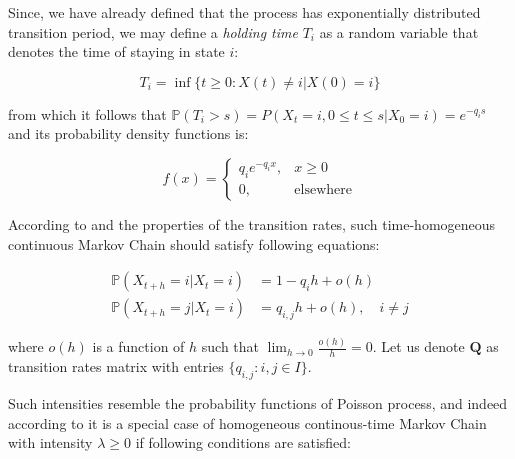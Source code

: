 Since, we have already defined that the process has exponentially distributed transition period, we may define a \textit{holding time} $T_i$ as a random variable that denotes the time of staying in state $i$:

\begin{equation}
T_i = \inf \{t \geq 0 : X(t) \neq i | X(0) = i\}
\end{equation}

from which it follows that $\mathbb{P}(T_i>s) = P(X_t=i,0 \leq t \leq s|X_0=i) = e^{-q_i s}$ and its probability density functions is:

\begin{equation}
    f(x) = 
    \begin{cases}
        q_i e^{-q_i x}, & x \geq 0\\
        0, & \text{elsewhere}
    \end{cases}
\end{equation}

According to \citep{Praskova2012} and the properties of the transition rates, such time-homogeneous continuous Markov Chain should satisfy following equations:

\begin{equation}
    \begin{aligned}
        \mathbb{P}(X_{t+h}=i|X_t=i) &= 1 - q_i h + o(h) \\
        \mathbb{P}(X_{t+h}=j|X_t=i) &= q_{i,j} h + o(h), \quad i \neq j
    \end{aligned}
\end{equation}

where $o(h)$ is a function of $h$ such that $\lim_{h \to 0} \frac{o(h)}{h} = 0$. Let us denote $\textbf{Q}$ as transition rates matrix with entries $\{q_{i,j}: i,j \in I\}$.

Such intensities resemble the probability functions of Poisson process, and indeed according to \citep{Norris2012} it is a special case of homogeneous continous-time Markov Chain with intensity $\lambda \geq 0$ if following conditions are satisfied:

